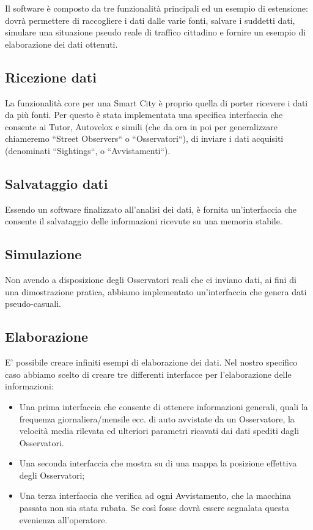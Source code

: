 \documentclass[a4paper,12pt]{report}
\begin{document}
Il software è composto da tre funzionalità principali ed un esempio di 
estensione: dovrà permettere di raccogliere i dati dalle varie fonti, salvare i 
suddetti dati, simulare una situazione pseudo reale di traffico cittadino e 
fornire un esempio di elaborazione dei dati ottenuti.

\subsection{Ricezione dati}
La funzionalità core per una Smart City è proprio quella di porter ricevere i 
dati da più fonti. Per questo è stata implementata una specifica interfaccia 
che consente ai Tutor, Autovelox e simili (che da ora in poi per generalizzare 
chiameremo ``Street Observers`` o ``Osservatori``), di inviare i dati acquisiti 
(denominati ``Sightings``, o ``Avvistamenti``).

\subsection{Salvataggio dati}
Essendo un software finalizzato all'analisi dei dati, è fornita un'interfaccia 
che consente il salvataggio delle informazioni ricevute su una memoria stabile.

\subsection{Simulazione}
Non avendo a disposizione degli Osservatori reali che ci inviano dati, 
ai fini di una dimostrazione pratica, abbiamo implementato un'interfaccia che 
genera dati pseudo-casuali. 

\subsection{Elaborazione}
E' possibile creare infiniti esempi di elaborazione dei dati. Nel nostro
specifico caso abbiamo scelto di creare tre differenti interfacce per 
l'elaborazione delle informazioni:
\begin{itemize}
  \item Una prima interfaccia che consente di ottenere informazioni generali, 
quali la frequenza giornaliera/mensile ecc. di auto avvistate da un 
Osservatore, la velocità media rilevata ed ulteriori parametri ricavati dai 
dati spediti dagli Osservatori.
  \item Una seconda interfaccia che mostra su di una mappa la posizione 
effettiva degli Osservatori;
  \item Una terza interfaccia che verifica ad ogni Avvistamento, che la 
macchina passata non sia stata rubata. Se così fosse dovrà essere segnalata 
questa evenienza all'operatore.
\end{itemize}
\end{document}
